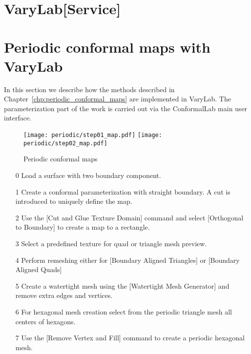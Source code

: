 \documentclass[Thesis.tex]{subfiles}
\begin{document}
\section{{\sc VaryLab[Service]}}


\section{Periodic conformal maps with {\sc VaryLab}}
In this section we describe how the methods described in Chapter~\ref{chp:periodic_conformal_maps} are implemented in {\sc VaryLab}. The parameterization part of the work is carried out via the {\sc ConformalLab} main user interface. 

\begin{figure}
\texttt{[image: periodic/step01\_map.pdf]}
\texttt{[image: periodic/step02\_map.pdf]}	
\caption{Periodic conformal maps}
\label{fig:periodic_algorithm}
\end{figure}

\begin{itemize}
\item[0] Load a surface with two boundary component.
\item[1] Create a conformal parameterization with straight boundary. A cut is introduced to uniquely define the map.
\item[2] Use the [Cut and Glue Texture Domain] command and select [Orthogonal to Boundary] to create a map to a rectangle.
\item[3] Select a predefined texture for quad or triangle mesh preview.
\item[4] Perform remeshing either for [Boundary Aligned Triangles] or [Boundary Aligned Quads]
\item[5] Create a watertight mesh using the [Watertight Mesh Generator] and remove extra edges and vertices.
\item[6] For hexagonal mesh creation select from the periodic triangle mesh all centers of hexagons. 
\item[7] Use the [Remove Vertex and Fill] command to create a periodic hexagonal mesh.
\end{itemize}
\end{document}
